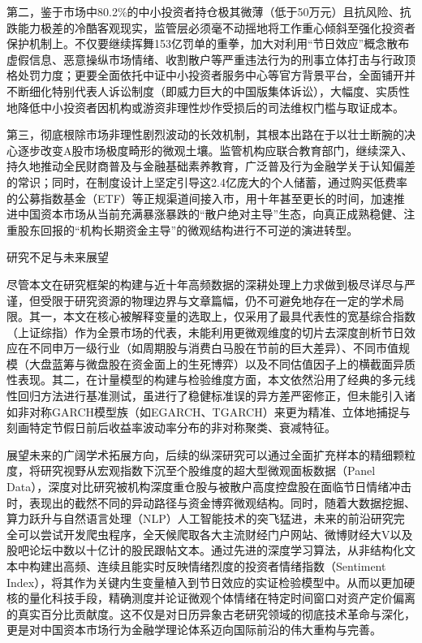 \documentclass{cupb-thesis}
\begin{document}
第二，鉴于市场中80.2\%的中小投资者持仓极其微薄（低于50万元）且抗风险、抗跌能力极差的冷酷客观现实，监管层必须毫不动摇地将工作重心倾斜至强化投资者保护机制上。不仅要继续挥舞153亿罚单的重拳，加大对利用“节日效应”概念散布虚假信息、恶意操纵市场情绪、收割散户等严重违法行为的刑事立体打击与行政顶格处罚力度；更要全面依托中证中小投资者服务中心等官方背景平台，全面铺开并不断细化特别代表人诉讼制度（即威力巨大的中国版集体诉讼），大幅度、实质性地降低中小投资者因机构或游资非理性炒作受损后的司法维权门槛与取证成本。

第三，彻底根除市场非理性剧烈波动的长效机制，其根本出路在于以壮士断腕的决心逐步改变A股市场极度畸形的微观土壤。监管机构应联合教育部门，继续深入、持久地推动全民财商普及与金融基础素养教育，广泛普及行为金融学关于认知偏差的常识；同时，在制度设计上坚定引导这2.4亿庞大的个人储蓄，通过购买低费率的公募指数基金（ETF）等正规渠道间接入市，用十年甚至更长的时间，加速推进中国资本市场从当前充满暴涨暴跌的“散户绝对主导”生态，向真正成熟稳健、注重股东回报的“机构长期资金主导”的微观结构进行不可逆的演进转型。


研究不足与未来展望

尽管本文在研究框架的构建与近十年高频数据的深耕处理上力求做到极尽详尽与严谨，但受限于研究资源的物理边界与文章篇幅，仍不可避免地存在一定的学术局限。其一，本文在核心被解释变量的选取上，仅采用了最具代表性的宽基综合指数（上证综指）作为全景市场的代表，未能利用更微观维度的切片去深度剖析节日效应在不同申万一级行业（如周期股与消费白马股在节前的巨大差异）、不同市值规模（大盘蓝筹与微盘股在资金面上的生死博弈）以及不同估值因子上的横截面异质性表现。其二，在计量模型的构建与检验维度方面，本文依然沿用了经典的多元线性回归方法进行基准测试，虽进行了稳健标准误的异方差严密修正，但未能引入诸如非对称GARCH模型族（如EGARCH、TGARCH）来更为精准、立体地捕捉与刻画特定节假日前后收益率波动率分布的非对称聚类、衰减特征。


展望未来的广阔学术拓展方向，后续的纵深研究可以通过全面扩充样本的精细颗粒度，将研究视野从宏观指数下沉至个股维度的超大型微观面板数据（Panel Data），深度对比研究被机构深度重仓股与被散户高度控盘股在面临节日情绪冲击时，表现出的截然不同的异动路径与资金博弈微观结构。同时，随着大数据挖掘、算力跃升与自然语言处理（NLP）人工智能技术的突飞猛进，未来的前沿研究完全可以尝试开发爬虫程序，全天候爬取各大主流财经门户网站、微博财经大V以及股吧论坛中数以十亿计的股民跟帖文本。通过先进的深度学习算法，从非结构化文本中构建出高频、连续且能实时反映情绪烈度的投资者情绪指数（Sentiment Index），将其作为关键内生变量植入到节日效应的实证检验模型中。从而以更加硬核的量化科技手段，精确测度并论证微观个体情绪在特定时间窗口对资产定价偏离的真实百分比贡献度。这不仅是对日历异象古老研究领域的彻底技术革命与深化，更是对中国资本市场行为金融学理论体系迈向国际前沿的伟大重构与完善。
\end{document}
